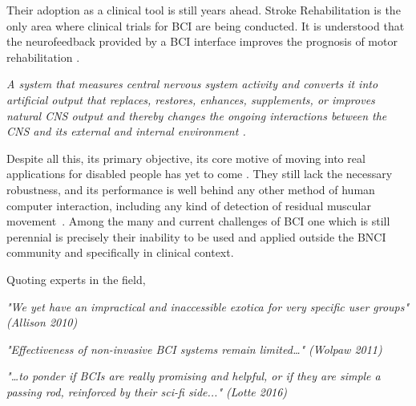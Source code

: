 Their adoption as a clinical tool is still years ahead.  Stroke Rehabilitation is the only area where clinical trials for BCI are being conducted. It is understood that the neurofeedback provided by a BCI interface improves the prognosis of motor rehabilitation \cite{Ang2011}.

\vspace{10px}

\begin{story}
\theoremstyle{definition}
\begin{definition}{}
\label{def:BCI}
\textit{A system that measures central nervous system activity and converts it into artificial output that replaces, restores, enhances, supplements, or improves natural CNS output and thereby changes the ongoing interactions between the CNS and its external and internal environment \cite{WolpawJonathanR2012}.}
\end{definition}
\end{story}

Despite all this, its primary objective, its core motive of moving into real applications for disabled people has yet to come \cite{Brunner2014,Jeunet2014,Toward2013}. They still lack the necessary robustness, and its performance is well behind any other method of human computer interaction, including any kind of detection of residual muscular movement~\cite{Clerc}. Among the many and current challenges of BCI \cite{Brunner2014} one which is still perennial is precisely their inability to be used and applied outside the BNCI community and specifically in clinical context.  

Quoting experts in the field,

\vspace{10px}

\textit{"We yet have an impractical and inaccessible exotica for very specific user groups" (Allison 2010)}

\vspace{10px}

\textit{"Effectiveness of non-invasive BCI systems remain limited…" (Wolpaw 2011)}

\vspace{10px}

\textit{"…to ponder if BCIs are really promising and helpful, or if they are simple a passing rod, reinforced by their sci-fi side..." (Lotte 2016)}

